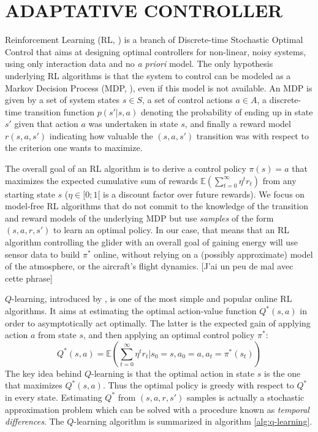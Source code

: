 \documentclass[a4paper, 10pt, conference]{ieeeconf}
\begin{document}
\section{ADAPTATIVE CONTROLLER}
\label{sec:control}

Reinforcement Learning (RL, \cite{sutton_book}) is a branch of Discrete-time Stochastic Optimal Control that aims at designing optimal controllers for non-linear, noisy systems, using only interaction data and no \emph{a priori} model. The only hypothesis underlying RL algorithms is that the system to control can be modeled as a Markov Decision Process (MDP, \cite{puterman}), even if this model is not available. An MDP is given by a set of system states $s\in S$, a set of control actions $a\in A$, a discrete-time transition function $p(s'|s,a)$ denoting the probability of {\color{red}ending up in} state $s'$ given that action $a$ was undertaken in state $s$, and finally a reward model $r(s,a,s')$ indicating how valuable the $(s,a,s')$ transition was with respect to the criterion one wants to maximize.

The overall goal of an RL algorithm is to derive a control policy $\pi(s) = a$ that maximizes the expected cumulative sum of rewards $\mathbb{E}\left(\sum\limits_{t=0}^\infty \eta^t r_t\right)$ from any starting state $s$ ($\eta\in[0;1[$ is a discount factor over future rewards). We focus on model-free RL algorithms that do not {\color{red}commit to} the knowledge of the transition and reward models {\color{red}of the underlying MDP but} use \emph{samples} of the form $(s,a,r,s')$ to learn an optimal policy.
{\color{blue}In our case, that means that an RL algorithm controlling the glider with an overall goal of gaining energy will use sensor data to build $\pi^*$ online, without relying on a (possibly approximate) model of the atmosphere, or the aircraft's flight dynamics.} {\color{red}[J'ai un peu de mal avec cette phrase]}

$Q$-learning, introduced by \cite{watkins92qlearning}, is one of the most simple and popular online RL algorithms. It {\color{red}aims at estimating} the optimal action-value function $Q^*(s,a)$ in order to asymptotically act optimally. {\color{red}The latter} is the expected gain of applying action $a$ from state $s$, and then applying an optimal control policy $\pi^*$:
\begin{equation*}
Q^*(s,a) = \mathbb{E}\left(\sum\limits_{t=0}^\infty \eta^t r_t | s_0=s, a_0=a, a_t=\pi^*(s_t)\right)
\end{equation*}
The key idea behind $Q$-learning is that the optimal action in state $s$ is the one that maximizes $Q^*(s,a)$. Thus the optimal policy is greedy with respect to $Q^*$ in every state. Estimating $Q^*$ from $\left(s,a,r,s'\right)$ samples is actually a stochastic approximation problem which can be solved with a procedure known as \emph{temporal differences}. The $Q$-learning algorithm is summarized in algorithm \ref{alg:q-learning}.
\end{document}
